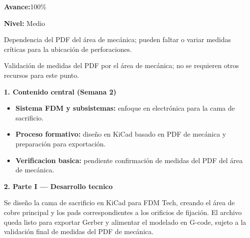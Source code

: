 \documentclass[11pt,a4paper]{article}
\newcommand{\AvancePorcentaje}{100\%}
\newcommand{\RiesgoNivel}{Medio}
\newcommand{\RiesgosDetalle}{Dependencia del PDF del \'area de mec\'anica; pueden faltar o variar medidas cr\'iticas para la ubicaci\'on de perforaciones.}
\newcommand{\RecursosNecesarios}{Validaci\'on de medidas del PDF por el \'area de mec\'anica; no se requieren otros recursos para este punto.}
\newif\ifShowNextSteps      \ShowNextStepsfalse
\newcommand{\ProximoPasoUno}{No aplica.}
\newcommand{\ProximoPasoDos}{No aplica.}
\newcommand{\ProximoPasoTres}{No aplica.}
\newcommand{\Field}[2]{\textbf{\color{CNCdark}#1}\hspace{4pt}{\color{CNCgray}#2}}
\newcommand{\SectionTitle}[1]{%
  \vspace{1mm}
  {\Large\bfseries\color{CNCblue}#1}\par
  \vspace{1mm}
}
\newcommand{\SafeItem}{\Needspace{3\baselineskip}\item}
\begin{document}
\clearpage

\begin{tcolorbox}[title=\textbf{\color{CNCblue}Avance de hito}]
\Field{Avance:}{ }\AvancePorcentaje
\end{tcolorbox}

\begin{tcolorbox}[title=\textbf{\color{CNCblue}Riesgos y dependencias}]\textbf{Nivel:} \RiesgoNivel\par
{\color{CNCgray}\RiesgosDetalle}
\end{tcolorbox}

\begin{tcolorbox}[title=\textbf{\color{CNCblue}Recursos necesarios}]
{\color{CNCgray}\RecursosNecesarios}
\end{tcolorbox}

\ifShowNextSteps
\begin{tcolorbox}[title=\textbf{\color{CNCblue}Proximos pasos (opcional)}]
\begin{itemize}[leftmargin=*,itemsep=2pt]
  \SafeItem \ProximoPasoUno
  \SafeItem \ProximoPasoDos
  \SafeItem \ProximoPasoTres
\end{itemize}
\end{tcolorbox}
\fi

\newpage

\SectionTitle{1. Contenido central (Semana 2)}
\begin{tcolorbox}
\begin{itemize}[leftmargin=*,itemsep=3pt]
  \SafeItem \textbf{Sistema FDM y subsistemas:} enfoque en electr\'onica para la cama de sacrificio.
  \SafeItem \textbf{Proceso formativo:} dise\~no en KiCad basado en PDF de mec\'anica y preparaci\'on para exportaci\'on.
  \SafeItem \textbf{Verificacion basica:} pendiente confirmaci\'on de medidas del PDF del \'area de mec\'anica.
\end{itemize}
\end{tcolorbox}

\SectionTitle{2. Parte I — Desarrollo tecnico}
\begin{tcolorbox}[colback=CNCsoft2,title=\textbf{\color{CNCblue}Resumen tecnico}]
{\color{CNCgray}
Se dise\~no la cama de sacrificio en KiCad para FDM Tech, creando el \'area de cobre
principal y los pads correspondientes a los orificios de fijaci\'on. El archivo queda listo
para exportar Gerber y alimentar el modelado en G-code, sujeto a la validaci\'on final
de medidas del PDF de mec\'anica.
}
\end{tcolorbox}
\end{document}
